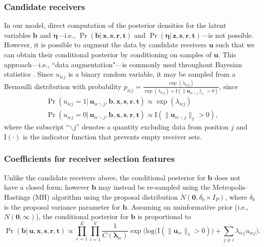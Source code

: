 \documentclass[ba]{imsart}
\numberwithin{equation}{section}
\theoremstyle{plain}
\begin{document}
	\subsubsection{Candidate receivers}
	In our model, direct computation of the posterior densities for the latent variables $\boldsymbol{b}$ and $\boldsymbol{\eta}$---i.e., $\Pr(\boldsymbol{b}|\,\boldsymbol{x},\boldsymbol{s}, \boldsymbol{r},\boldsymbol{t})$ and $\Pr(\boldsymbol{\eta}|\,\boldsymbol{z},\boldsymbol{s}, \boldsymbol{r},\boldsymbol{t})$---is not possible. However, it is possible to augment the data by candidate receivers $\boldsymbol{u}$ such that we can obtain their conditional posterior by conditioning on samples of $\boldsymbol{u}$. %
	This approach---i.e., ``data augmentation"---is commonly used throughout Bayesian statistics \citep{tanner1987calculation,neal2015exact}. Since $u_{iej}$ is a binary random variable, it may be sampled from a Bernoulli distribution with probability $p_{iej} =\frac{\exp(\lambda_{iej})}{\exp(\lambda_{iej})+\text{I}(\lVert\boldsymbol{u}_{ie\backslash j}\rVert_1 > 0 )}$, since
	\begin{equation}
		\begin{aligned}
			&\Pr(u_{iej}=1| \,\boldsymbol{u}_{ie\backslash j}, \boldsymbol{b}, \boldsymbol{x},\boldsymbol{s}, \boldsymbol{r},\boldsymbol{t}) \propto \exp(\lambda_{iej}) \\
			&\Pr(u_{iej}=0|\, \boldsymbol{u}_{ie\backslash j},\boldsymbol{b}, \boldsymbol{x},\boldsymbol{s}, \boldsymbol{r},\boldsymbol{t})\propto \text{I}(\lVert\boldsymbol{u}_{ie\backslash j}\rVert_1 > 0 ),
		\end{aligned}
		\label{eqn:latentreceiver}
	\end{equation}
	where the subscript ``$\backslash j$'' denotes a quantity excluding data from position $j$ and $\text{I}(\cdot)$ is the indicator function that prevents empty receiver sets. 
	\subsubsection{Coefficients for receiver selection features}
	Unlike the candidate receivers above, the conditional posterior for $\boldsymbol{b}$ does not have a closed form; however $\boldsymbol{b}$ may instead be re-sampled using the Metropolis--Hastings (MH) algorithm using the proposal distribution $N(\boldsymbol{0}, \delta_b\times I_P)$, where $\delta_b$ is the proposal variance parameter for $\boldsymbol{b}$. Assuming an uninformative prior (i.e., $N(\boldsymbol{0},\infty)$), the conditional posterior for $\boldsymbol{b}$ is proportional to~
	\begin{equation}
		\Pr(\boldsymbol{b}| \,\boldsymbol{u}, \boldsymbol{x}, \boldsymbol{s}, \boldsymbol{r},\boldsymbol{t})\propto \prod_{e=1}^E
		\prod_{i=1}^V \frac{1}{C(\boldsymbol{\lambda}_{ie})}\exp\Big(\mbox{log}\big(\text{I}( \lVert \boldsymbol{u}_{ie}\rVert_1 > 0)\big) + \sum\limits_{j \neq i} \lambda_{iej}u_{iej}\Big).
		\label{eqn:latentedge}
	\end{equation}
\end{document}
